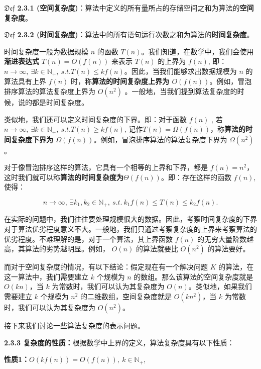 \documentclass[a5paper]{ctexart}
\newcommand \ding[2]{$\mathfrak{Def}$ \textbf{#1}：#2}
\begin{document}
		\ding{ 2.3.1 (空间复杂度)} {算法中定义的所有量所占的存储空间之和为算法的\textbf{空间复杂度}。}
		
		\ding{ 2.3.2 (时间复杂度)} {算法中的所有语句运行次数之和为算法的\textbf{时间复杂度}。}
		
		\vspace{12pt}
		
		时间复杂度一般为数据规模 $n$ 的函数 $T(n)$。我们知道，在数学中，我们会使用\textbf{渐进表达式} $T(n) = O(f(n))$ 来表示 $T(n)$ 的上界为 $f(n)$, 即：$n\rightarrow \infty, \ \exists k \in \mathbb{N_+},\ s.t. T(n) \le kf(n)$。因此，当我们能够求出数据规模为 $n$ 的算法具有上界 $f(n)$ 时，称\textbf{算法的时间复杂度上界为 $O(f(n))$}。例如，冒泡排序算法的算法复杂度上界为 $O(n^2)$ 。一般地，当我们提到算法复杂度的时候，说的都是时间复杂度。
		
		类似地，我们还可以定义时间复杂度的下界。即：对于函数 $f(n)$ , 若$n\rightarrow \infty, \ \exists k \in \mathbb{N_+},\ s.t. T(n) \ge kf(n)$, 记作$T(n) = \Omega(f(n))$，称\textbf{算法的时间复杂度下界为 $\Omega(f(n))$}。例如，冒泡排序算法的算法复杂度下界为 $\Omega(n^2)$ 。
		
		对于像冒泡排序这样的算法，它具有一个相等的上界和下界，都是 $f(n) = n^2$，这时我们就可以称\textbf{算法的时间复杂度为$\Theta(f(n))$}。即：存在这样的函数 $f(n)$, 使得：
		
		$$
		n\rightarrow \infty, \ \exists k_1, k_2 \in \mathbb{N_+},\ s.t.\ k_1f(n) \le T(n) \le k_2f(n).
		$$
		
		在实际的问题中，我们往往要处理规模很大的数据。因此，考察时间复杂度的下界对于算法优劣程度意义不大。一般地，我们只通过考察复杂度的上界来考察算法的优劣程度。不难理解的是，对于一个算法，其上界函数 $f(n)$ 的无穷大量阶数越高，其算法的劣势越明显。例如， $O(n)$ 的算法就要比 $O(n^2)$ 的算法要好。
		
		而对于空间复杂度的情况，有以下结论：假定现在有一个解决问题 $K$ 的算法，在这一算法中，我们需要建立 $k$ 个规模为 $n$ 的数组。那么该算法的空间复杂度就是 $O(kn)$，当 $k$ 为常数时，我们可以认为其复杂度为 $O(n)$。类似地，如果我们需要建立 $k$ 个规模为 $n^2$ 的二维数组，空间复杂度就是 $O(kn^2)$，当 $k$ 为常数时，我们可以认为其复杂度为 $O(n^2)$。
		
		接下来我们讨论一些算法复杂度的表示问题。
		
		\vspace{12pt}
		
		\textbf{2.3.3 复杂度的性质：}根据数学中上界的定义，算法复杂度具有以下性质：
		
		\textbf{性质1：}$O(kf(n)) = O(f(n)),\ k \in \mathbb{N_+}$,
		
\end{document}
